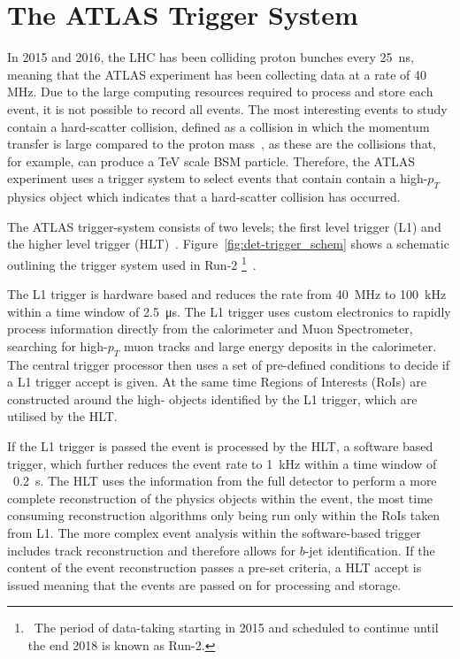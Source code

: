 \chapter{The ATLAS Trigger System}
\label{sec:trig}

In 2015 and 2016, the LHC has been colliding proton bunches every \SI{25}{\nano\second},
meaning that the ATLAS experiment has been collecting data at a rate of 40 MHz.
Due to the large computing resources required to process and store each event,
it is not possible to record all events.
The most interesting events to study contain a hard-scatter collision,
defined as a collision in which the momentum transfer is large compared to the proton mass~\cite{trig-hard_scatter},
as these are the collisions that, for example, can produce a TeV scale BSM particle.
Therefore, the ATLAS experiment uses a trigger system to select events that contain
contain a high-$p_{T}$ physics object which indicates that a hard-scatter collision has occurred.

The ATLAS trigger-system consists of two levels;
the first level trigger (L1) and the higher level trigger (HLT)~\cite{det-run2_trigger}.
Figure~\ref{fig:det-trigger_schem} shows a schematic outlining the trigger system used in Run-2
\footnote{\ The period of data-taking starting in 2015 and scheduled to continue until the end 2018 is known as Run-2.}~\cite{det-run2_triggerPerf}. 

The L1 trigger is hardware based and reduces the rate from 40~MHz to 100~kHz within a time window of \SI{2.5}{\micro\second}.
The L1 trigger uses custom electronics to rapidly process information directly from the
calorimeter and Muon Spectrometer, searching for high-$p_{T}$ muon tracks and large energy deposits in the calorimeter.
The central trigger processor then uses a set of pre-defined conditions
to decide if a L1 trigger accept is given. 
At the same time Regions of Interests (RoIs) are constructed around the high-\pT{} objects identified by the L1 trigger, which are utilised by the HLT. 

If the L1 trigger is passed the event is processed by the HLT,
a software based trigger,
which further reduces the event rate to 1~kHz within a time window of ~\SI{0.2}{\second}.
The HLT uses the information from the full detector
to perform a more complete reconstruction of the physics objects within the event,
the most time consuming reconstruction algorithms only being run only within the RoIs taken from L1.
The more complex event analysis within the software-based trigger includes
track reconstruction and therefore allows for $b$-jet identification.
If the content of the event reconstruction passes a pre-set criteria, a HLT accept is issued
meaning that the events are passed on for processing and storage. 

